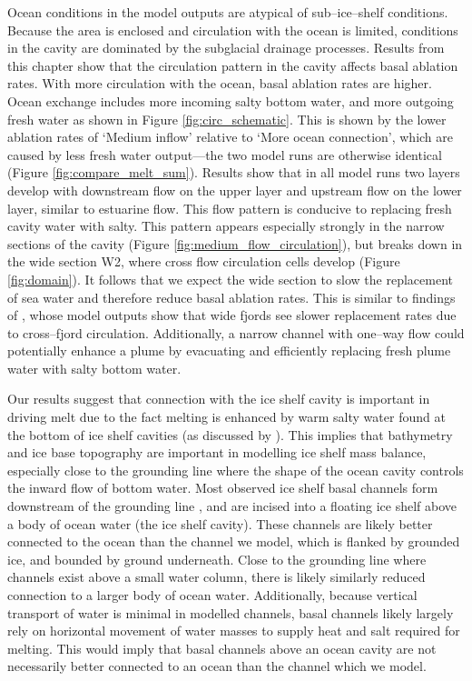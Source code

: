 Ocean conditions in the model outputs are atypical of sub--ice--shelf conditions. Because the area is enclosed and circulation with the ocean is limited, conditions in the cavity are dominated by the subglacial drainage processes.
Results from this chapter show that the circulation pattern in the cavity affects basal ablation rates. With more circulation with the ocean, basal ablation rates are higher. Ocean exchange includes more incoming salty bottom water, and more outgoing fresh water as shown in Figure \ref{fig:circ_schematic}. This is shown by the lower ablation rates of `Medium inflow' relative to `More ocean connection', which are caused by less fresh water output---the two model runs are otherwise identical (Figure \ref{fig:compare_melt_sum}).  Results show that in all model runs two layers develop with downstream flow on the upper layer and upstream flow on the lower layer,  similar to estuarine flow. This flow pattern is conducive to replacing fresh cavity water with salty. This pattern appears especially strongly in the narrow sections of the cavity (Figure \ref{fig:medium_flow_circulation}), but breaks down in the wide section W2, where cross flow circulation cells develop (Figure \ref{fig:domain}). It follows that we expect the wide section to slow the replacement of sea water and therefore reduce basal ablation rates. This is similar to findings of \cite{carroll2017subglacial}, whose model outputs show that wide fjords see slower replacement rates due to cross--fjord circulation. Additionally, a narrow channel with one--way flow could potentially enhance a plume by evacuating and efficiently replacing fresh plume water with salty bottom water.

Our results suggest that connection with the ice shelf cavity is important in driving melt due to the fact melting is enhanced by warm salty water found at the bottom of ice shelf cavities  (as discussed by \cite{goldberg2019accurately}). This implies that bathymetry and ice base topography are important in modelling ice shelf mass balance, especially close to the grounding line where the shape of the ocean cavity controls the inward flow of bottom water. 
Most observed ice shelf basal channels form downstream of the grounding line \citep{alley2016impacts}, and are incised into a floating ice shelf above a body of ocean water (the ice shelf cavity). These channels are likely better connected to the ocean than the channel we model, which is flanked by grounded ice, and bounded by ground underneath. Close to the grounding line where channels exist above a small water column, there is likely similarly reduced connection to a larger body of ocean water. Additionally, because vertical transport of water is minimal in modelled channels, basal channels likely largely rely on horizontal movement of water masses to supply heat and salt required for melting. This would imply that basal channels above an ocean cavity are not necessarily better connected to an ocean than the channel which we model. 

